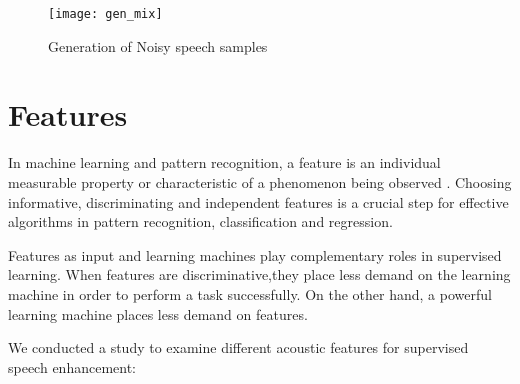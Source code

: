 \begin{figure}[!htbp]
\centering
\texttt{[image: gen\_mix]}
\caption{Generation of Noisy speech samples}
\label{fig:gen_mix}
\end{figure}

\section{Features}
In machine learning and pattern recognition, a feature is an individual measurable property or characteristic of a phenomenon being observed \cite{wiki:feat}. Choosing informative, discriminating and independent features is a crucial step for effective algorithms in pattern recognition, classification and regression. \par Features as input and learning machines play complementary roles in supervised learning. When features are discriminative,they place less demand on the learning machine in order to perform a task successfully. On the other hand, a powerful learning machine places less demand on features.\par We conducted a study to examine different acoustic features for supervised speech enhancement:

